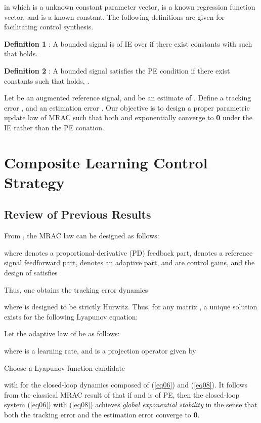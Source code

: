 \documentclass[conference]{IEEEtran}
\begin{document}
in which  is a unknown constant parameter vector,  is a known regression function vector, and  is a known constant. The following definitions are given for facilitating control synthesis.

\textbf{Definition 1} \cite{Chowdhary2010a}: A bounded signal  is of IE over   if there exist constants  with  such that  holds.

\textbf{Definition 2} \cite{Chowdhary2010a}: A bounded signal  satisfies the PE condition if there exist constants  such that  holds, .

Let  be an augmented reference signal, and  be an estimate of . Define a tracking error , and an estimation error . Our objective is to design a proper parametric update law of MRAC such that both  and  exponentially converge to \textbf{0} under the IE rather than the PE conation.


\section{Composite Learning Control Strategy}

\subsection{Review of Previous Results}

From \cite{Ioannou1996}, the MRAC law can be designed as follows:

where  denotes a proportional-derivative (PD) feedback part,  denotes a reference signal feedforward part,  denotes an adaptive part,  and  are control gains, and the design of  satisfies

Thus, one obtains the tracking error dynamics

where  is designed to be strictly Hurwitz. Thus, for any matrix , a unique solution  exists for the following Lyapunov equation:


Let the adaptive law of  be as follows:

where  is a learning rate, and  is a projection operator given by \cite{Ioannou1996}

Choose a Lyapunov function candidate

with  for the closed-loop dynamics composed of (\ref{eq06}) and (\ref{eq08}). It follows from the classical MRAC result of \cite{Ioannou1996} that if  and  is of PE, then the closed-loop system (\ref{eq06}) with (\ref{eq08}) achieves \emph{global exponential stability} in the sense that both the tracking error  and the estimation error  converge to \textbf{0}.
\end{document}
